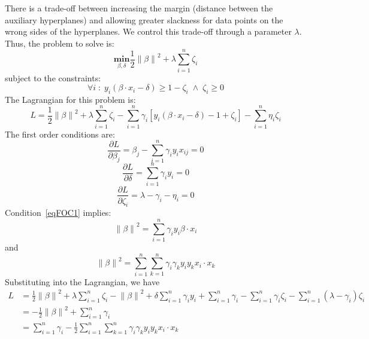 \documentclass[11pt]{article}
\begin{document}
There is a trade-off between increasing the margin (distance between the auxiliary hyperplanes) and allowing greater slackness for data points on the wrong sides of the hyperplanes. We control this trade-off through a parameter $\lambda$. Thus, the problem to solve is:
\begin{equation} \label{eq1}
\underset{\beta,\delta}{\mathbf{min}} \frac{1}{2} {\left \| \beta \right \|}^2 + \lambda \sum_{i=1}^n \zeta_i
\end{equation}
subject to the constraints:
\begin{equation} \label{eq1}
\forall i \; : \; y_i \left( \beta \cdot x_i - \delta \right) \geq 1 - \zeta_i \; \wedge \; \zeta_i \geq 0
\end{equation}
The Lagrangian for this problem is:
\begin{equation} \label{eq1}
L = \frac{1}{2} {\left \| \beta \right \|}^2 + \lambda \sum_{i=1}^n \zeta_i - \sum_{i=1}^n \gamma_i \left[ y_i \left( \beta \cdot x_i - \delta \right) - 1 + \zeta_i \right] - \sum_{i=1}^n \eta_i \zeta_i
\end{equation}
The first order conditions are:
\begin{equation} \label{eqFOC1}
\frac{\partial L}{\partial \beta_j} = \beta_j - \sum_{i=1}^n \gamma_i y_i x_{ij} = 0
\end{equation}
\begin{equation} \label{eq1}
\frac{\partial L}{\partial \delta} = \sum_{i=1}^n \gamma_i y_i = 0
\end{equation}
\begin{equation} \label{eq1}
\frac{\partial L}{\partial \zeta_i} = \lambda - \gamma_i - \eta_i = 0
\end{equation}
Condition~\eqref{eqFOC1} implies:
\begin{equation} \label{eq1}
{\left \| \beta \right \|}^2 = \sum_{i=1}^n \gamma_i y_i \beta \cdot x_i
\end{equation}
and
\begin{equation} \label{eq1}
{\left \| \beta \right \|}^2 = \sum_{i=1}^n \sum_{k=1}^n \gamma_i \gamma_k y_i y_k x_i \cdot x_k
\end{equation}
Substituting into the Lagrangian, we have
\begin{equation} \label{eq1}
\begin{split}
L & = \frac{1}{2} {\left \| \beta \right \|}^2 + \lambda \sum_{i=1}^n \zeta_i - {\left \| \beta \right \|}^2 + \delta \sum_{i=1}^n \gamma_i y_i + \sum_{i=1}^n \gamma_i - \sum_{i=1}^n \gamma_i \zeta_i - \sum_{i=1}^n \left( \lambda - \gamma_i \right) \zeta_i \\
 & = - \frac{1}{2} {\| \beta \|}^2 + \sum_{i=1}^n \gamma_i \\
 & = \sum_{i=1}^n \gamma_i - \frac{1}{2} \sum_{i=1}^n \sum_{k=1}^n \gamma_i \gamma_k y_i y_k x_i \cdot x_k
\end{split}
\end{equation}
\end{document}
